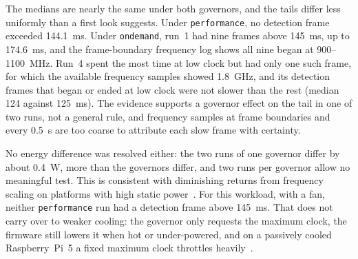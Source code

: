 \documentclass[conference]{IEEEtran}
\begin{document}
The medians are nearly the same under both governors, and the tails differ less uniformly than a first look suggests. Under \texttt{performance}, no detection frame exceeded \SI{144.1}{\milli\second}. Under \texttt{ondemand}, run~1 had nine frames above \SI{145}{\milli\second}, up to \SI{174.6}{\milli\second}, and the frame-boundary frequency log shows all nine began at 900--\SI{1100}{\mega\hertz}. Run~4 spent the most time at low clock but had only one such frame, for which the available frequency samples showed \SI{1.8}{\giga\hertz}, and its detection frames that began or ended at low clock were not slower than the rest (median 124 against \SI{125}{\milli\second}). The evidence supports a governor effect on the tail in one of two runs, not a general rule, and frequency samples at frame boundaries and every \SI{0.5}{\second} are too coarse to attribute each slow frame with certainty.

No energy difference was resolved either: the two runs of one governor differ by about \SI{0.4}{\watt}, more than the governors differ, and two runs per governor allow no meaningful test. This is consistent with diminishing returns from frequency scaling on platforms with high static power~\cite{lesueur2010}. For this workload, with a fan, neither \texttt{performance} run had a detection frame above \SI{145}{\milli\second}. That does not carry over to weaker cooling: the governor only requests the maximum clock, the firmware still lowers it when hot or under-powered, and on a passively cooled Raspberry~Pi~5 a fixed maximum clock throttles heavily~\cite{marasini2026}.
\end{document}
